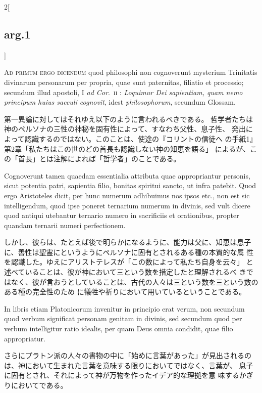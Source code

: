 \documentclass[paper=a4paper,fontsize=10pt,jafontsize=9pt,titlepage]{jlreq}
\begin{document}
\begin{paracol}{2}[\subsection{arg.1}]
\switchcolumn*[\subsection{ad.1}]

{\scshape Ad primum ergo dicendum} quod philosophi non cognoverunt mysterium
Trinitatis divinarum personarum per propria, quae sunt paternitas,
filiatio et processio; secundum illud apostoli, I {\itshape ad
 Cor}.~{\scshape ii} : {\itshape Loquimur
Dei sapientiam, quam nemo principum huius saeculi cognovit}, idest
{\itshape philosophorum}, secundum Glossam.

\switchcolumn

第一異論に対してはそれゆえ以下のように言われるべきである。
哲学者たちは神のペルソナの三性の神秘を固有性によって、すなわち父性、息子性、
 発出によって認識するのではない。このことは、使途の『コリントの信徒へ
 の手紙1』第2章「私たちはこの世のどの首長も認識しない神の知恵を語る」
 によるが、この「首長」とは注解によれば「哲学者」のことである。

\switchcolumn*

Cognoverunt tamen quaedam essentialia
attributa quae appropriantur personis, sicut potentia patri, sapientia
filio, bonitas spiritui sancto, ut infra patebit. Quod ergo
Aristoteles dicit, per hunc numerum adhibuimus nos ipsos etc., non est
sic intelligendum, quod ipse poneret ternarium numerum in divinis, sed
vult dicere quod antiqui utebantur ternario numero in sacrificiis et
orationibus, propter quandam ternarii numeri perfectionem.

\switchcolumn

しかし、彼らは、たとえば後で明らかになるように、能力は父に、知恵は息子
 に、善性は聖霊にというようにペルソナに固有とされるある種の本質的な属
 性を認識した。ゆえにアリストテレスが「この数によって私たち自身を云々」
 と述べていることは、彼が神において三という数を措定したと理解されるべ
 きではなく、彼が言おうとしていることは、古代の人々は三という数を三という数のある種の完全性のため
 に犠牲や祈りにおいて用いているということである。

\switchcolumn*

In libris
etiam Platonicorum invenitur in principio erat verum, non secundum
quod verbum significat personam genitam in divinis, sed secundum quod
per verbum intelligitur ratio idealis, per quam Deus omnia condidit,
quae filio appropriatur.

\switchcolumn

さらにプラトン派の人々の書物の中に「始めに言葉があった」が見出されるの
 は、神において生まれた言葉を意味する限りにおいてではなく、言葉が、
息子に固有とされ、それによって神が万物を作ったイデア的な理拠を意
 味するかぎりにおいてである。


\end{paracol}
\end{document}
